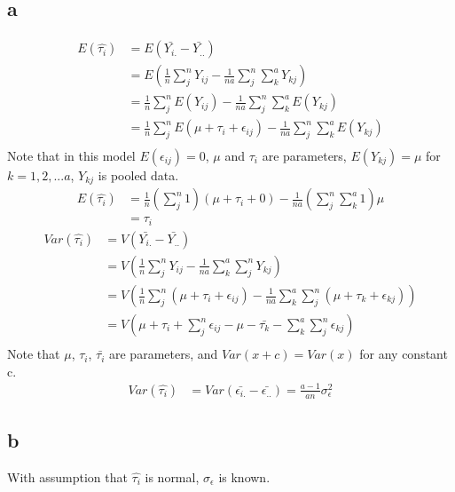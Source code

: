 \documentclass[11pt,letterpaper]{article}
\let\hat\widehat
\begin{document}
\subsection*{a}
\begin{align*}
E(\hat{\tau_i}) &= E(\bar{Y_{i.}} - \bar{Y_{..}}) \\
&= E( \frac{1}{n} \sum_j^n Y_{ij}  - \frac{1}{na} \sum_{j}^n \sum_k^a Y_{kj}) \\
&= \frac{1}{n} \sum_j^n E( Y_{ij})  - \frac{1}{na} \sum_{j}^n \sum_k^a E( Y_{kj}) \\
&= \frac{1}{n} \sum_j^n E(\mu + \tau_i + \epsilon_{ij}) - \frac{1}{na} \sum_{j}^n \sum_k^a E( Y_{kj}) \\
\end{align*}
\noindent Note that in this model $E(\epsilon_{ij}) = 0$, $\mu$ and $\tau_i$ are parameters, $E(Y_{kj}) = \mu$ for $k = 1, 2, ... a$, $Y_{kj}$ is pooled data. 
\begin{align*}
E(\hat{\tau_i}) &=  \frac{1}{n} (\sum_j^n 1) (\mu + \tau_i + 0) - \frac{1}{na} (\sum_{j}^n \sum_k^a 1) \mu \\
&= \tau_i
\end{align*}
\begin{align*}
Var(\hat{\tau_i}) &= V(\bar{Y_{i.}} - \bar{Y_{..}}  ) \\
&= V(\frac{1}{n} \sum_j^n Y_{ij} - \frac{1}{na} \sum_k^a \sum_j^n Y_{kj}) \\
&= V(\frac{1}{n} \sum_j^n (\mu + \tau_i + \epsilon_{ij})- \frac{1}{na} \sum_k^a \sum_j^n (\mu + \tau_k + \epsilon_{kj})) \\
&= V(\mu + \tau_i + \sum_j^n \epsilon_{ij} - \mu - \bar{\tau_k} - \sum_k^a \sum_j^n \epsilon_{kj} ) \\
\end{align*}
\noindent Note that $\mu$, $\tau_i$, $\bar{\tau_i}$ are parameters, and $Var(x + c) = Var(x)$ for any constant c.
\begin{align*}
Var(\hat{\tau_i}) &= Var( \bar{\epsilon_{i.}} - \bar{\epsilon_{..}} ) = \frac{a-1}{an} \sigma_{\epsilon}^2
\end{align*}

\subsection*{b}
With assumption that $\hat{\tau_i}$ is normal, $\sigma_{\epsilon}$ is known.
\end{document}
